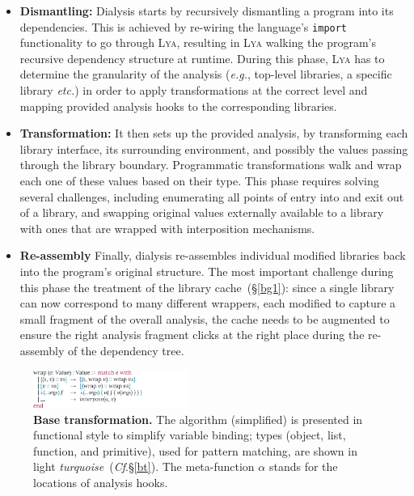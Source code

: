 \documentclass[letterpaper,twocolumn,10pt]{article}
\def\eg{{\em e.g.}, }
\def\etc{{\em etc.}\xspace}
\newcommand{\ttt}[1]{\texttt{#1}}
\newcommand{\cf}[1]{(\emph{Cf}.\S\ref{#1})}
\newcommand{\sx}[1]{(\S\ref{#1})}
\newcommand{\sys}{{\scshape Lya}\xspace}
\begin{document}
\begin{itemize}
  
  \item \textbf{Dismantling:}
Dialysis starts by recursively dismantling a program into its dependencies. %
This is achieved by re-wiring the language's \ttt{import} functionality to go through \sys, resulting in \sys walking the program's recursive dependency structure at runtime.
During this phase, \sys has to determine the granularity of the analysis (\eg top-level libraries, a specific library \etc) in order to apply transformations at the correct level and mapping provided analysis hooks to the corresponding libraries.

  \item \textbf{Transformation:}
It then sets up the provided analysis, by transforming each library interface, its surrounding environment, and possibly the values passing through the library boundary.
Programmatic transformations walk and wrap each one of these values based on their type.
This phase requires solving several challenges, including enumerating all points of entry into and exit out of a library, 
and swapping original values externally available to a library with ones that are wrapped with interposition mechanisms.

  \item \textbf{Re-assembly}
Finally, dialysis re-assembles individual modified libraries back into the program's original structure.
The most important challenge during this phase the treatment of the library cache~\sx{bg1}:
  since a single library can now correspond to many different wrappers, each modified to capture a small fragment of the overall analysis, the cache needs to be augmented to ensure the right analysis fragment clicks at the right place during the re-assembly of the dependency tree.

\end{itemize}


\begin{figure}[t]
\raggedleft 
\includegraphics[width=0.45\textwidth]{./figs/lya_base.pdf}
\caption{
  \textbf{Base transformation.}
  \textmd{
  The algorithm (simplified) is presented in functional style to simplify variable binding; types (object, list, function, and primitive), used for pattern matching, are shown in light {\color{cdb} \emph{turquoise}}~\cf{bt}. The meta-function $\alpha$ stands for the locations of analysis hooks.
  }
}
\label{fig:base}
\end{figure}
\end{document}
